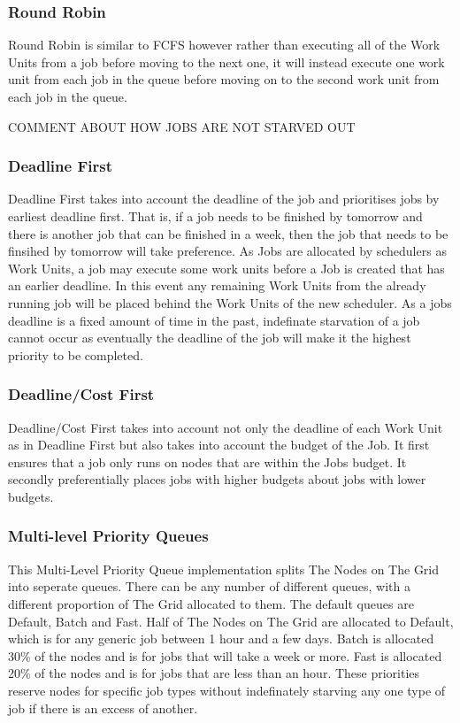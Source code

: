 \subsubsection{Round Robin}
\label{roundrobin}

Round Robin is similar to FCFS however rather than executing all of the Work Units from a job before moving to the next one, it will instead execute one work unit from each job in the queue before moving on to the second work unit from each job in the queue. 

COMMENT ABOUT HOW JOBS ARE NOT STARVED OUT

\subsubsection{Deadline First}
\label{deadlinefirst}

Deadline First takes into account the deadline of the job and prioritises jobs by earliest deadline first. That is, if a job needs to be finished by tomorrow and there is another job that can be finished in a week, then the job that needs to be finsihed by tomorrow will take preference. As Jobs are allocated by schedulers as Work Units, a job may execute some work units before a Job is created that has an earlier deadline. In this event any remaining Work Units from the already running job will be placed behind the Work Units of the new scheduler. As a jobs deadline is a fixed amount of time in the past, indefinate starvation of a job cannot occur as eventually the deadline of the job will make it the highest priority to be completed. 

\subsubsection{Deadline\slash Cost First}
\label{deadlinecostfirst}

Deadline\slash Cost First takes into account not only the deadline of each Work Unit as in Deadline First but also takes into account the budget of the Job. It first ensures that a job only runs on nodes that are within the Jobs budget. It secondly preferentially places jobs with higher budgets about jobs with lower budgets. 

\subsubsection{Multi-level Priority Queues}
\label{multi-levelpriorityqueues}

This Multi-Level Priority Queue implementation splits The Nodes on The Grid into seperate queues. There can be any number of different queues, with a different proportion of The Grid allocated to them. The default queues are Default, Batch and Fast. Half of The Nodes on The Grid are allocated to Default, which is for any generic job between 1 hour and a few days. Batch is allocated 30\% of the nodes and is for jobs that will take a week or more. Fast is allocated 20\% of the nodes and is for jobs that are less than an hour. These priorities reserve nodes for specific job types without indefinately starving any one type of job if there is an excess of another.

